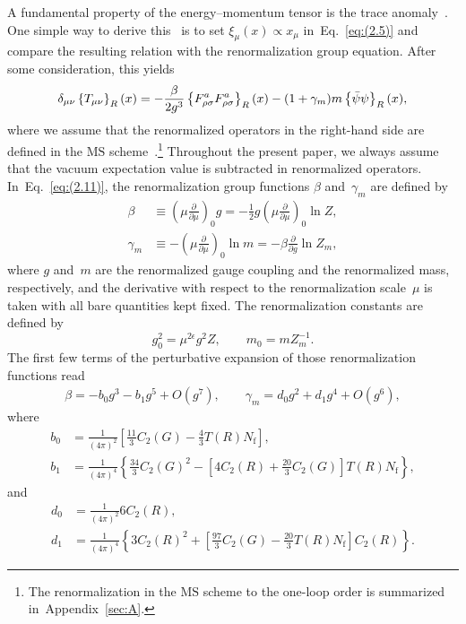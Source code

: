 A fundamental property of the energy--momentum tensor is the trace
anomaly~\cite{Crewther:1972kn,Chanowitz:1972vd,Adler:1976zt,Nielsen:1977sy,%
Collins:1976yq}. One simple way to derive
this~\cite{Fujikawa:1980rc,Fujikawa:2004cx} is to set $\xi_\mu(x)\propto x_\mu$
in~Eq.~\eqref{eq:(2.5)} and compare the resulting relation with the
renormalization group equation. After some consideration, this yields
\begin{equation}
   \delta_{\mu\nu}
   \left\{T_{\mu\nu}\right\}_R(x)
   =-\frac{\beta}{2g^3}\left\{F_{\rho\sigma}^aF_{\rho\sigma}^a\right\}_R(x)
   -(1+\gamma_m)m\left\{\Bar\psi\psi\right\}_R(x),
\label{eq:(2.11)}
\end{equation}
where we assume that the renormalized operators in the right-hand side are
defined in the $\text{MS}$ scheme~\cite{Collins:1984xc}.\footnote{The
renormalization in the $\text{MS}$ scheme to the one-loop order is summarized
in~Appendix~\ref{sec:A}.} Throughout the present paper, we always assume that
the vacuum expectation value is subtracted in renormalized operators.
In~Eq.~\eqref{eq:(2.11)}, the renormalization group functions $\beta$
and~$\gamma_m$ are defined by
\begin{align}
   \beta&\equiv
   \left(\mu\frac{\partial}{\partial\mu}\right)_0g
   =-\frac{1}{2}g\left(\mu\frac{\partial}{\partial\mu}\right)_0\ln Z,
\label{eq:(2.12)}\\
   \gamma_m&\equiv
   -\left(\mu\frac{\partial}{\partial\mu}\right)_0\ln m
   =-\beta\frac{\partial}{\partial g}\ln Z_m,
\label{eq:(2.13)}
\end{align}
where $g$ and~$m$ are the renormalized gauge coupling and the renormalized
mass, respectively, and the derivative with respect to the renormalization
scale~$\mu$ is taken with all bare quantities kept fixed. The
renormalization constants are defined by
\begin{equation}
   g_0^2=\mu^{2\epsilon}g^2Z,\qquad m_0=mZ_m^{-1}.
\label{eq:(2.14)}
\end{equation}
The first few terms of the perturbative expansion of those renormalization
functions read
\begin{align}
   \beta=-b_0g^3-b_1g^5+O(g^7),\qquad\gamma_m=d_0g^2+d_1g^4+O(g^6),
\label{eq:(2.15)}
\end{align}
where~\cite{Caswell:1974gg,Jones:1974mm}
\begin{align}
   b_0&=\frac{1}{(4\pi)^2}
   \left[\frac{11}{3}C_2(G)-\frac{4}{3}T(R)N_{\mathrm{f}}\right],
\label{eq:(2.16)}\\
   b_1&=\frac{1}{(4\pi)^4}
   \left\{
   \frac{34}{3}C_2(G)^2-\left[4C_2(R)+\frac{20}{3}C_2(G)\right]T(R)N_{\mathrm{f}}
   \right\},
\label{eq:(2.17)}
\end{align}
and~\cite{Tarrach:1980up,Nachtmann:1981zg}
\begin{align}
   d_0&=\frac{1}{(4\pi)^2}6C_2(R),
\label{eq:(2.18)}\\
   d_1&=\frac{1}{(4\pi)^4}
   \left\{
   3C_2(R)^2
   +\left[\frac{97}{3}C_2(G)-\frac{20}{3}T(R)N_{\mathrm{f}}\right]C_2(R)
   \right\}.
\label{eq:(2.19)}
\end{align}
